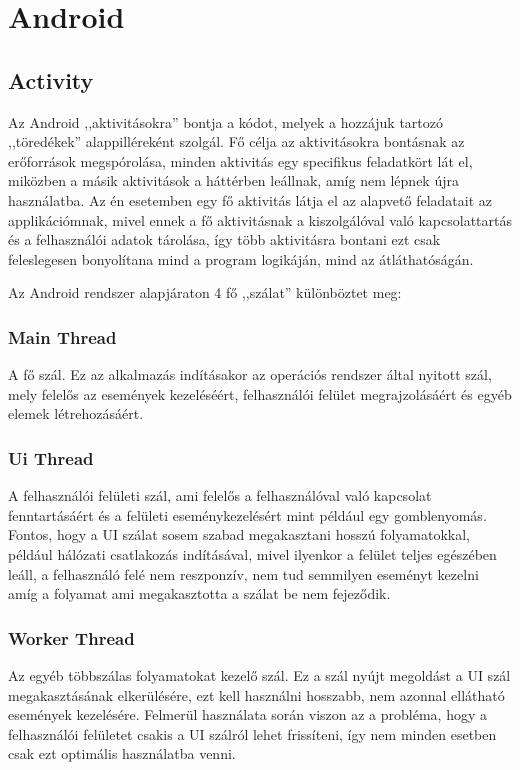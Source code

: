 \documentclass[
]{thesis-ekf}
\theoremstyle{definition}
\theoremstyle{remark}
\begin{document}
\section{Android}
\subsection{Activity}
Az Android ,,aktivitásokra'' bontja a kódot, melyek a hozzájuk tartozó ,,töredékek'' alappilléreként szolgál.
Fő célja az aktivitásokra bontásnak az erőforrások megspórolása, minden aktivitás egy specifikus feladatkört lát el, 
miközben a másik aktivitások a háttérben leállnak, amíg nem lépnek újra használatba. Az én esetemben egy fő aktivitás
látja el az alapvető feladatait az applikációmnak, mivel ennek a fő aktivitásnak a kiszolgálóval való kapcsolattartás és
a felhasználói adatok tárolása, így több aktivitásra bontani ezt csak feleslegesen bonyolítana mind a program logikáján,
mind az átláthatóságán.

Az Android rendszer alapjáraton 4 fő ,,szálat'' különböztet meg:
\subsubsection{Main Thread}
A fő szál. Ez az alkalmazás indításakor az operációs rendszer által nyitott szál, mely felelős az események kezeléséért,
felhasználói felület megrajzolásáért és egyéb elemek létrehozásáért.
	
\subsubsection{Ui Thread}
A felhasználói felületi szál, ami felelős a felhasználóval való kapcsolat fenntartásáért 
és a felületi eseménykezelésért mint például egy gomblenyomás. Fontos, 
hogy a UI szálat sosem szabad megakasztani hosszú folyamatokkal, 
például hálózati csatlakozás indításával, mivel ilyenkor a felület teljes egészében leáll, 
a felhasználó felé nem reszponzív, nem tud semmilyen eseményt kezelni 
amíg a folyamat ami megakasztotta a szálat be nem fejeződik.
	
\subsubsection{Worker Thread}
Az egyéb többszálas folyamatokat kezelő szál. Ez a szál nyújt megoldást a UI szál megakasztásának elkerülésére,
ezt kell használni hosszabb, nem azonnal ellátható események kezelésére. Felmerül használata során viszon az a
probléma, hogy a felhasználói felületet csakis a UI szálról lehet frissíteni, így nem minden esetben csak ezt
optimális használatba venni. 
	
\end{document}
